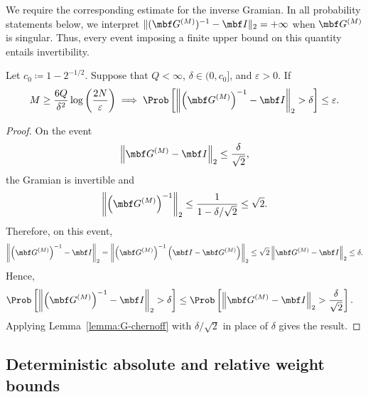 \documentclass[10pt,dvipsnames]{amsart}
\begin{document}
We require the corresponding estimate for the inverse Gramian.
In all probability statements below, we interpret
\(\|(\mbf G^{(M)})^{-1}-\mbf I\|_2=+\infty\) when \(\mbf G^{(M)}\) is
singular. Thus, every event imposing a finite upper bound on this quantity
entails invertibility.

\begin{lemma}
\label{lemma:F-chernoff}
    Let \(c_0 \coloneqq 1 - 2^{-1/2}\). Suppose that \(Q < \infty\), \(\delta\in(0,c_0]\), and \(\varepsilon>0\). If
    \begin{align}
        \label{eq:Fhat-sampling-criterion}
        M
        \ge
        \frac{6Q}{\delta^2}
        \log\left(\frac{2N}{\varepsilon}\right)
        \implies
        \Prob\left[
            \left\|
            \left(\mbf G^{(M)}\right)^{-1}-\mbf I
            \right\|_2>\delta
        \right]
        \leq \varepsilon .
    \end{align}
\end{lemma}

\begin{proof}
    On the event
    \[
        \left\|\mbf G^{(M)}-\mbf I\right\|_2
        \leq
        \frac{\delta}{\sqrt 2},
    \]
    the Gramian is invertible and
    \[
        \left\|
        \left(\mbf G^{(M)}\right)^{-1}
        \right\|_2
        \leq
        \frac{1}{1-\delta/\sqrt 2}
        \leq
        \sqrt 2.
    \]
    Therefore, on this event,
    \begin{align*}
        \left\|
        \left(\mbf G^{(M)}\right)^{-1}-\mbf I
        \right\|_2
        =
        \left\|
        \left(\mbf G^{(M)}\right)^{-1}
        \left(\mbf I-\mbf G^{(M)}\right)
        \right\|_2
        \leq
        \sqrt 2
        \left\|
        \mbf G^{(M)}-\mbf I
        \right\|_2
        \leq \delta .
    \end{align*}
    Hence,
    \begin{align*}
        \Prob\left[
            \left\|
            \left(\mbf G^{(M)}\right)^{-1}-\mbf I
            \right\|_2>\delta
        \right]
        &\leq
        \Prob\left[
            \left\|\mbf G^{(M)}-\mbf I\right\|_2
            >
            \frac{\delta}{\sqrt 2}
        \right].
    \end{align*}
    Applying Lemma~\ref{lemma:G-chernoff} with
    \(\delta/\sqrt 2\) in place of \(\delta\) gives the result.
\end{proof}

\subsection{Deterministic absolute and relative weight bounds}
\label{subsec:deterministic-weight-bounds}
\end{document}
